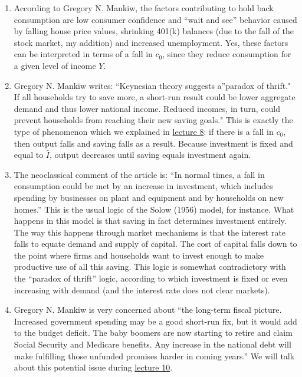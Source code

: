 \documentclass[]{book}
\theoremstyle{definition}
\theoremstyle{definition}
\theoremstyle{definition}
\theoremstyle{remark}
\begin{document}
\begin{enumerate}
\def\labelenumi{\arabic{enumi}.}
\item
  According to Gregory N. Mankiw, the factors contributing to hold back
  consumption are low consumer confidence and ``wait and see'' behavior
  caused by falling house price values, shrinking 401(k) balances (due
  to the fall of the stock market, my addition) and increased
  unemployment. Yes, these factors can be interpreted in terms of a fall
  in \(c_0\), since they reduce consumption for a given level of income
  \(Y\).
\item
  Gregory N. Mankiw writes: ``Keynesian theory suggests a''paradox of
  thrift." If all households try to save more, a short-run result could
  be lower aggregate demand and thus lower national income. Reduced
  incomes, in turn, could prevent households from reaching their new
  saving goals." This is exactly the type of phenomenon which we
  explained in \protect\hyperlink{paradox-thrift}{lecture 8}: if there
  is a fall in \(c_0\), then output falls and saving falls as a result.
  Because investment is fixed and equal to \(\bar{I}\), output decreases
  until saving equals investment again.
\item
  The neoclassical comment of the article is: ``In normal times, a fall
  in consumption could be met by an increase in investment, which
  includes spending by businesses on plant and equipment and by
  households on new homes.'' This is the usual logic of the Solow (1956)
  model, for instance. What happens in this model is that saving in fact
  determines investment entirely. The way this happens through market
  mechanisms is that the interest rate falls to equate demand and supply
  of capital. The cost of capital falls down to the point where firms
  and households want to invest enough to make productive use of all
  this saving. This logic is somewhat contradictory with the ``paradox
  of thrift'' logic, according to which investment is fixed or even
  increasing with demand (and the interest rate does not clear markets).
\item
  Gregory N. Mankiw is very concerned about ``the long-term fiscal
  picture. Increased government spending may be a good short-run fix,
  but it would add to the budget deficit. The baby boomers are now
  starting to retire and claim Social Security and Medicare benefits.
  Any increase in the national debt will make fulfilling those unfunded
  promises harder in coming years.'' We will talk about this potential
  issue during \protect\hyperlink{public-debt}{lecture 10}.
\end{enumerate}
\end{document}
